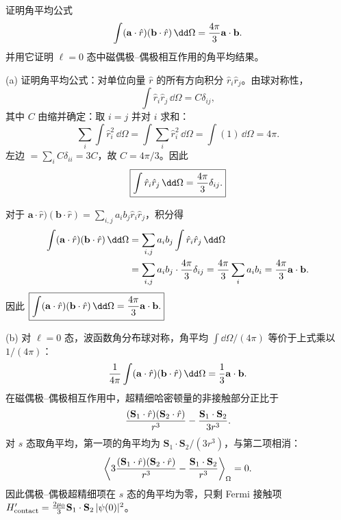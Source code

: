 \begin{question}
证明角平均公式
\[
\int (\mathbf a\cdot\hat r)(\mathbf b\cdot\hat r)\,\dd\Omega={4\pi\over3}\mathbf a\cdot\mathbf b.
\]
并用它证明 $\ell=0$ 态中磁偶极--偶极相互作用的角平均结果。
\end{question}
\begin{solution}
(a) 证明角平均公式：对单位向量 $\hat r$ 的所有方向积分 $\hat r_i\hat r_j$。由球对称性，
\[
\int \hat r_i\hat r_j\,\dd\Omega = C\delta_{ij},
\]
其中 $C$ 由缩并确定：取 $i=j$ 并对 $i$ 求和：
\[
\sum_i\int \hat r_i^2\,\dd\Omega = \int \sum_i \hat r_i^2\,\dd\Omega = \int (1)\,\dd\Omega = 4\pi.
\]
左边 $=\sum_i C\delta_{ii} = 3C$，故 $C=4\pi/3$。因此
\[
\boxed{\int \hat r_i\hat r_j\,\dd\Omega={4\pi\over3}\delta_{ij}.}
\]

对于 $\mathbf a\cdot\hat r)(\mathbf b\cdot\hat r) = \sum_{i,j}a_i b_j \hat r_i\hat r_j$，积分得
\[
\begin{aligned}
\int (\mathbf a\cdot\hat r)(\mathbf b\cdot\hat r)\,\dd\Omega
&= \sum_{i,j} a_i b_j \int \hat r_i\hat r_j\,\dd\Omega \\
&= \sum_{i,j} a_i b_j \cdot {4\pi\over3}\delta_{ij}
= {4\pi\over3}\sum_i a_i b_i
= {4\pi\over3}\mathbf a\cdot\mathbf b.
\end{aligned}
\]
因此 $\boxed{\int(\mathbf a\cdot\hat r)(\mathbf b\cdot\hat r)\,\dd\Omega={4\pi\over3}\mathbf a\cdot\mathbf b.}$

(b) 对 $\ell=0$ 态，波函数角分布球对称，角平均 $\int\dd\Omega/(4\pi)$ 等价于上式乘以 $1/(4\pi)$：
\[
{1\over4\pi}\int (\mathbf a\cdot\hat r)(\mathbf b\cdot\hat r)\,\dd\Omega = {1\over3}\mathbf a\cdot\mathbf b.
\]
在磁偶极--偶极相互作用中，超精细哈密顿量的非接触部分正比于
\[
{(\mathbf S_1\cdot\hat r)(\mathbf S_2\cdot\hat r)\over r^3} - {\mathbf S_1\cdot\mathbf S_2\over 3r^3}.
\]
对 $s$ 态取角平均，第一项的角平均为 $\mathbf S_1\cdot\mathbf S_2/(3r^3)$，与第二项相消：
\[
\left\langle 3{(\mathbf S_1\cdot\hat r)(\mathbf S_2\cdot\hat r)\over r^3} - {\mathbf S_1\cdot\mathbf S_2\over r^3}\right\rangle_{\Omega} = 0.
\]
因此偶极--偶极超精细项在 $s$ 态的角平均为零，只剩 Fermi 接触项 $H'_{\rm contact} = {2\mu_0\over3}\mathbf S_1\cdot\mathbf S_2\,|\psi(0)|^2$。
\end{solution}

